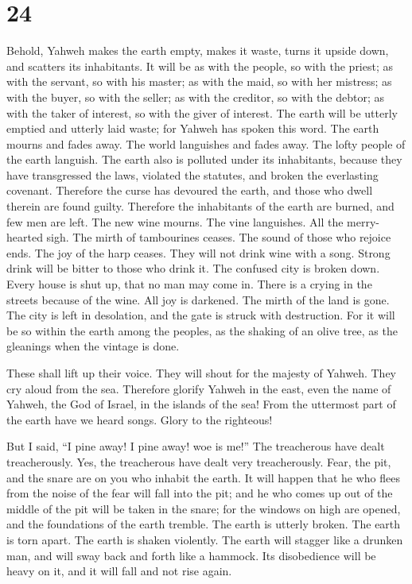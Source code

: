 \hypertarget{section-23}{%
\section{24}\label{section-23}}

 Behold, Yahweh makes the earth empty, makes it waste,
turns it upside down, and scatters its inhabitants.  It
will be as with the people, so with the priest; as with the servant, so
with his master; as with the maid, so with her mistress; as with the
buyer, so with the seller; as with the creditor, so with the debtor; as
with the taker of interest, so with the giver of interest.
 The earth will be utterly emptied and utterly laid waste;
for Yahweh has spoken this word.  The earth mourns and
fades away. The world languishes and fades away. The lofty people of the
earth languish.  The earth also is polluted under its
inhabitants, because they have transgressed the laws, violated the
statutes, and broken the everlasting covenant.  Therefore
the curse has devoured the earth, and those who dwell therein are found
guilty. Therefore the inhabitants of the earth are burned, and few men
are left.  The new wine mourns. The vine languishes. All
the merry-hearted sigh.  The mirth of tambourines ceases.
The sound of those who rejoice ends. The joy of the harp ceases.
 They will not drink wine with a song. Strong drink will
be bitter to those who drink it.  The confused city is
broken down. Every house is shut up, that no man may come in.
 There is a crying in the streets because of the wine.
All joy is darkened. The mirth of the land is gone.  The
city is left in desolation, and the gate is struck with destruction.
 For it will be so within the earth among the peoples, as
the shaking of an olive tree, as the gleanings when the vintage is done.

 These shall lift up their voice. They will shout for the
majesty of Yahweh. They cry aloud from the sea. 
Therefore glorify Yahweh in the east, even the name of Yahweh, the God
of Israel, in the islands of the sea!  From the uttermost
part of the earth have we heard songs. Glory to the righteous!

But I said, ``I pine away! I pine away! woe is me!'' The treacherous
have dealt treacherously. Yes, the treacherous have dealt very
treacherously.  Fear, the pit, and the snare are on you
who inhabit the earth.  It will happen that he who flees
from the noise of the fear will fall into the pit; and he who comes up
out of the middle of the pit will be taken in the snare; for the windows
on high are opened, and the foundations of the earth tremble.
 The earth is utterly broken. The earth is torn apart.
The earth is shaken violently.  The earth will stagger
like a drunken man, and will sway back and forth like a hammock. Its
disobedience will be heavy on it, and it will fall and not rise again.

